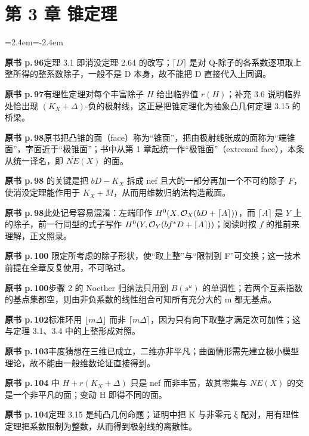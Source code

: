 \section*{第 3 章 锥定理}
\begin{list}{}{\leftmargin=2.4em\itemindent=-2.4em\itemsep=2pt\parsep=0pt}
\item \textbf{原书 p.\,96}\quad 定理 3.1 即消没定理 2.64 的改写；$\lceil D\rceil$ 是对 Q-除子的各系数逐项取上整所得的整系数除子，一般不是 D 本身，故不能把 D 直接代入上同调。
\item \textbf{原书 p.\,97}\quad 有理性定理对每个丰富除子 $H$ 给出临界值 $r(H)$；补充 3.6 说明临界处恰出现 $(K_X+\Delta)$-负的极射线，这正是把锥定理化为抽象凸几何定理 3.15 的桥梁。
\item \textbf{原书 p.\,98}\quad 原书把凸锥的面（face）称为“锥面”，把由极射线张成的面称为“端锥面”，字面近于“极锥面”；书中从第 1 章起统一作“极锥面”（extremal face），本条从统一译名，即 $\overline{NE}(X)$ 的面。
\item \textbf{原书 p.\,98} 的关键是把 $bD-K_X$ 拆成 nef 且大的一部分再加一个不可约除子 $F$，使消没定理能作用于 $K_X+M$，从而用维数归纳法构造截面。
\item \textbf{原书 p.\,98}\quad 此处记号容易混淆：左端印作 $H^0(X,\mathcal{O}_X(bD+\lceil A\rceil))$，而 $\lceil A\rceil$ 是 $Y$ 上的除子，前一行同型的式子写作 $H^0(Y,\mathcal{O}_Y(bf^*D+\lceil A\rceil))$；阅读时按 $f$ 的推前来理解，正文照录。
\item \textbf{原书 p.\,100} 限定所考虑的除子形状，使“取上整”与“限制到 F”可交换；这一技术前提在全章反复使用，不可略过。
\item \textbf{原书 p.\,100}\quad 步骤 2 的 Noether 归纳法只用到 $B(s^u)$ 的单调性；若两个互素指数的基点集都空，则由非负系数的线性组合可知所有充分大的 m 都无基点。
\item \textbf{原书 p.\,102}\quad 标准环用 $\lfloor m\Delta\rfloor$ 而非 $\lceil m\Delta\rceil$，因为只有向下取整才满足次可加性；这与定理 3.1、3.4 中的上整形成对照。
\item \textbf{原书 p.\,103}\quad 丰度猜想在三维已成立，二维亦非平凡；曲面情形需先建立极小模型理论，故不能由一般维数论证直接得到。
\item \textbf{原书 p.\,104} 中 $H+r(K_X+\Delta)$ 只是 nef 而非丰富，故其零集与 $\overline{NE}(X)$ 的交是一个非平凡的面；变动 H 即得不同的面。
\item \textbf{原书 p.\,104}\quad 定理 3.15 是纯凸几何命题；证明中把 K 与非零元 ξ 配对，用有理性定理把系数限制为整数，从而得到极射线的离散性。

\end{list}
